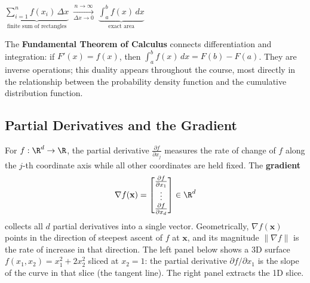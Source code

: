 \documentclass[main.tex]{subfiles}
\begin{document}
\begin{center}
\hfill
{}
\end{center}
\vspace{-4pt}
\begin{center}
{\footnotesize $\displaystyle\underbrace{\sum_{i=1}^{n} f(x_i)\,\Delta x}_{\text{finite sum of rectangles}} \;\xrightarrow[\Delta x \to 0]{n \to \infty}\; \underbrace{\int_a^b f(x)\,dx}_{\text{exact area}}$}
\end{center}

The \textbf{Fundamental Theorem of Calculus} connects differentiation and integration: if $F'(x) = f(x)$, then $\int_a^b f(x)\,dx = F(b) - F(a)$. They are inverse operations; this duality appears throughout the course, most directly in the relationship between the probability density function and the cumulative distribution function.

\subsection{Partial Derivatives and the Gradient}

For $f : \R^d \to \R$, the partial derivative $\frac{\partial f}{\partial x_j}$ measures the rate of change of $f$ along the $j$-th coordinate axis while all other coordinates are held fixed. The \textbf{gradient}
$$\nabla f(\mathbf{x}) = \begin{bmatrix} \frac{\partial f}{\partial x_1} \\ \vdots \\ \frac{\partial f}{\partial x_d} \end{bmatrix} \in \R^d$$
collects all $d$ partial derivatives into a single vector. Geometrically, $\nabla f(\mathbf{x})$ points in the direction of steepest ascent of $f$ at $\mathbf{x}$, and its magnitude $\|\nabla f\|$ is the rate of increase in that direction. The left panel below shows a 3D surface $f(x_1, x_2) = x_1^2 + 2x_2^2$ sliced at $x_2 = 1$: the partial derivative $\partial f / \partial x_1$ is the slope of the curve in that slice (the tangent line). The right panel extracts the 1D slice.
\end{document}
